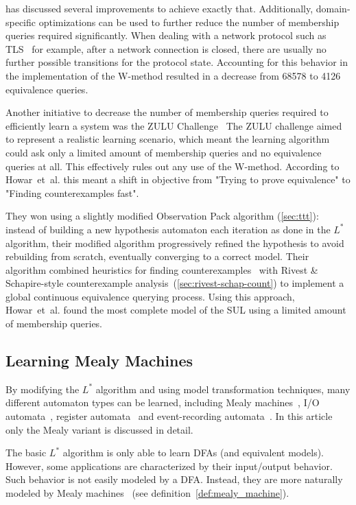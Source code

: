  has discussed several improvements to achieve exactly
that. Additionally, domain-specific optimizations can be used to further reduce
the number of membership queries required significantly.  When dealing with a
network protocol such as TLS~\cite{deRuiter2015} 
for example, after a network connection is closed, there are usually no further
possible transitions for the protocol state.  Accounting for this behavior in
the implementation of the W-method resulted in a decrease from 68578 to 4126
equivalence queries.

Another initiative to decrease the number of membership queries required
to efficiently learn a system was the ZULU Challenge~\cite{Howar2010b}
The ZULU challenge aimed to represent a realistic learning scenario,
which meant the learning algorithm could ask only a limited amount of
membership queries and no equivalence queries at all.
This effectively rules out any use of the W-method.
According to Howar~et~al. this meant a shift in objective from
"Trying to prove equivalence" to "Finding counterexamples fast".

They won using a slightly modified Observation Pack algorithm (\cref{sec:ttt}):
instead of building a new hypothesis automaton each iteration as done
in the $L^*$ algorithm, their modified algorithm progressively refined
the hypothesis to avoid rebuilding from scratch,
eventually converging to a correct model.
Their algorithm combined heuristics for finding
counterexamples~\cite{Howar2010b} with Rivest \& Schapire-style counterexample
analysis~(\cref{sec:rivest-schap-count}) to implement a global continuous
equivalence querying process.
Using this approach, Howar~et~al. found the most complete
model of the SUL using a limited amount of membership queries.

\subsection{Learning Mealy Machines}
\label{sec:learn-mealy-mach}

By modifying the $L^*$ algorithm and using model transformation techniques, many
different automaton types can be learned, including Mealy machines~\cite{Shahbaz2009}, I/O automata~\cite{Aarts2010a}, register automata~\cite{Howar2012} and event-recording automata~\cite{Grinchtein05}. In this
article only the Mealy variant is discussed in detail.

The basic $L^*$ algorithm is only able to learn DFAs (and equivalent
models). However, some applications are characterized by their input/output behavior.
Such behavior is not easily modeled by a DFA. Instead, they are more naturally
modeled by Mealy machines~\cite{Shahbaz2009} (see definition~\ref{def:mealy_machine}).

